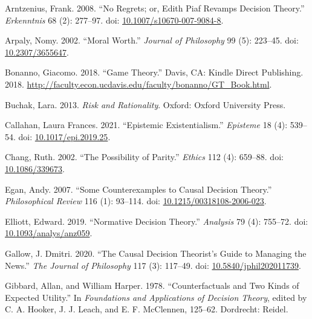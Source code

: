 \documentclass[
  10pt,
  letterpaper,
  DIV=11,
  numbers=noendperiod,
  twoside]{scrartcl}
\newlength{\cslhangindent}
\newenvironment{CSLReferences}[2] %
 {\begin{list}{}{%
  \setlength{\itemindent}{0pt}
  \setlength{\leftmargin}{0pt}
  \setlength{\parsep}{0pt}
  \ifodd #1
   \setlength{\leftmargin}{\cslhangindent}
   \setlength{\itemindent}{-1\cslhangindent}
  \fi
  \setlength{\itemsep}{#2\baselineskip}}}
 {\end{list}}
\begin{document}
\label{refs}
\begin{CSLReferences}{1}{0}
Arntzenius, Frank. 2008. {``No Regrets; or, Edith Piaf Revamps Decision
Theory.''} \emph{Erkenntnis} 68 (2): 277--97. doi:
\href{https://doi.org/10.1007/s10670-007-9084-8}{10.1007/s10670-007-9084-8}.

Arpaly, Nomy. 2002. {``Moral Worth.''} \emph{Journal of Philosophy} 99
(5): 223--45. doi:
\href{https://doi.org/10.2307/3655647}{10.2307/3655647}.

Bonanno, Giacomo. 2018. {``Game Theory.''} Davis, CA: Kindle Direct
Publishing. 2018.
\url{http://faculty.econ.ucdavis.edu/faculty/bonanno/GT_Book.html}.

Buchak, Lara. 2013. \emph{Risk and Rationality}. Oxford: Oxford
University Press.

Callahan, Laura Frances. 2021. {``Epistemic Existentialism.''}
\emph{Episteme} 18 (4): 539--54. doi:
\href{https://doi.org/10.1017/epi.2019.25}{10.1017/epi.2019.25}.

Chang, Ruth. 2002. {``The Possibility of Parity.''} \emph{Ethics} 112
(4): 659--88. doi:
\href{https://doi.org/10.1086/339673}{10.1086/339673}.

Egan, Andy. 2007. {``{Some Counterexamples to Causal Decision
Theory}.''} \emph{Philosophical Review} 116 (1): 93--114. doi:
\href{https://doi.org/10.1215/00318108-2006-023}{10.1215/00318108-2006-023}.

Elliott, Edward. 2019. {``Normative Decision Theory.''} \emph{Analysis}
79 (4): 755--72. doi:
\href{https://doi.org/10.1093/analys/anz059}{10.1093/analys/anz059}.

Gallow, J. Dmitri. 2020. {``The Causal Decision Theorist's Guide to
Managing the News.''} \emph{The Journal of Philosophy} 117 (3): 117--49.
doi:
\href{https://doi.org/10.5840/jphil202011739}{10.5840/jphil202011739}.

Gibbard, Allan, and William Harper. 1978. {``Counterfactuals and Two
Kinds of Expected Utility.''} In \emph{Foundations and Applications of
Decision Theory}, edited by C. A. Hooker, J. J. Leach, and E. F.
McClennen, 125--62. Dordrecht: Reidel.


\end{CSLReferences}
\end{document}

